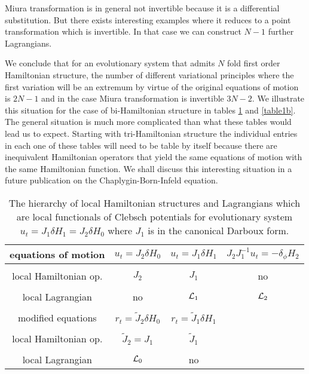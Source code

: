 \documentclass[a4paper,12pt]{article}
\begin{document}
Miura transformation is in general not invertible because it is a
differential substitution. But there exists interesting examples
where it reduces to a point transformation which is invertible. In
that case we can construct $N-1$ further Lagrangians.

We conclude that for an evolutionary system that admits $N$ fold
first order Hamiltonian structure, the number of different
variational principles where the first variation will be an
extremum by virtue of the original equations of motion is $2N-1$
and in the case Miura transformation is invertible $3N-2$. We
illustrate this situation for the case of bi-Hamiltonian structure
in tables \ref{table1a} and \ref{table1b}. The general situation
is much more complicated than what these tables would lead us to
expect. Starting with tri-Hamiltonian structure the individual
entries in each one of these tables will need to be table by
itself because there are inequivalent Hamiltonian operators that
yield the same equations of motion with the same Hamiltonian
function. We shall discuss this interesting situation in a future
publication on the Chaplygin-Born-Infeld equation.

\begin{table}
\begin{tabular}{c||c|c|c}
equations of motion   & $u_t = J_2 \delta H_0 $ & $u_t = J_1
\delta H_1$ & $
 J_2 J_1^{-1} u_t = - \delta_\phi H_2 $ \\ \hline
\\[-4.5mm] local Hamiltonian op.   &  $J_2$ & $J_1$ & no
\\ \hline
\\[-4.5mm] local Lagrangian   & no & ${\cal L}_1$ & ${\cal L}_2$
\\ \hline\hline
\\[-4.5mm] modified equations & $r_t = \tilde{J}_2 \delta H_0$ & $r_t = \tilde{J}_1 \delta H_1$
& \\ \hline
\\ [-4.5mm] local Hamiltonian op.  & $\tilde{J}_2 = J_1$ & $\tilde{J}_1$ &
\\ \hline
\\ [-4.5mm] local Lagrangian  & ${\cal L}_0$ & no &
\end{tabular}
\caption{The hierarchy of local Hamiltonian structures and
Lagrangians which are local functionals of Clebsch potentials for
evolutionary system $u_t = J_1 \delta H_1 = J_2 \delta H_0$ where
$J_1$ is in the canonical Darboux form. } \label{table1a}
\end{table}
\end{document}
